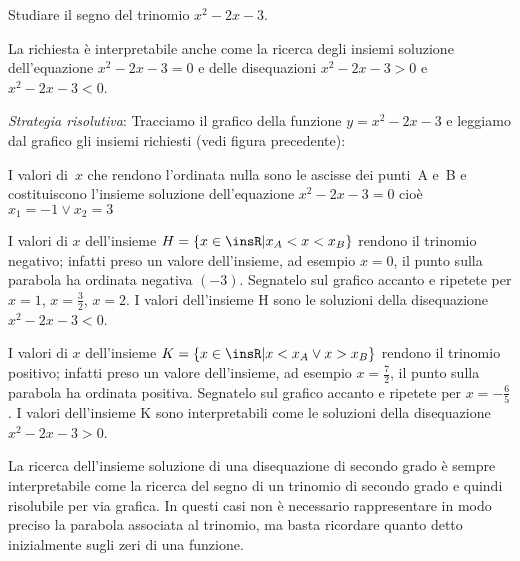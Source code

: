 \begin{esempio}
Studiare il segno del trinomio $x^2-2x-3$.

La richiesta è interpretabile anche come la ricerca degli insiemi soluzione 
dell'equazione $x^2-2x-3=0$ e delle disequazioni $x^2-2x-3>0$ e $x^2-2x-3<0$.

\emph{Strategia risolutiva}:
Tracciamo il grafico della funzione $y=x^2-2x-3$ e leggiamo dal grafico gli 
insiemi richiesti (vedi figura precedente):
\begin{itemize*}
\item I valori di~$x$ che rendono l'ordinata nulla sono le ascisse dei 
punti~A 
e~B e costituiscono l'insieme soluzione dell'equazione $x^2-2x-3=0$ cioè 
$x_1=-1\vee x_2=3$
\item I valori di $x$ dell'insieme $H=\{x\in \insR | x_A<x<x_B\}$ rendono il 
trinomio negativo; infatti preso un valore dell'insieme, ad esempio $x=0$, il 
punto sulla parabola ha ordinata negativa $(-3)$. Segnatelo sul grafico 
accanto 
e ripetete per $x=1$, $x=\frac 3 2$, $x=2$.
I valori dell'insieme H sono le soluzioni della disequazione $x^2-2x-3<0$.
\item I valori di $x$ dell'insieme $K=\{x\in \insR | x<x_A\vee x>x_B\}$ 
rendono 
il trinomio positivo; infatti preso un valore dell'insieme, ad esempio 
$x=\frac 
7 2$, il punto sulla parabola ha ordinata positiva. Segnatelo sul grafico 
accanto e ripetete per $x=-\frac{6}{5}$.
I valori dell'insieme K sono interpretabili come le soluzioni della 
disequazione 
$x^2-2x-3>0$.
\end{itemize*}
\end{esempio}

\osservazione La ricerca dell'insieme soluzione di una disequazione di 
secondo 
grado è sempre interpretabile come la ricerca del segno di un trinomio di 
secondo grado e quindi risolubile per via grafica. In questi casi non è 
necessario rappresentare in modo preciso la parabola associata al trinomio, 
ma 
basta ricordare quanto detto inizialmente sugli zeri di una funzione.

